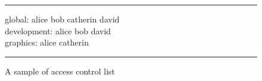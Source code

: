 \begin{figure}[htb]
\small
\rule{\linewidth}{.08em}

global: alice bob catherin david \\
development: alice bob david \\
graphics: alice catherin \\

\rule{\linewidth}{.08em}
\caption{A sample of access control list}
\label{f:access-list}
\end{figure}

\endinput

